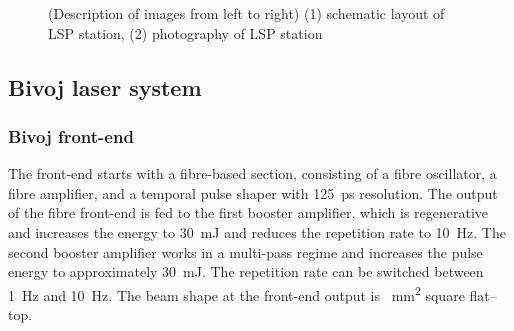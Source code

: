 \begin{figure}[H]
\begin{center}
  \hspace{1cm}
  \caption[(Description of images from left to right) (1) schematic layout of LSP station, (2) photography of LSP station]
    {(Description of images from left to right) (1) schematic layout of LSP station, (2) photography of LSP station \cite{bohm_kaufman_brajer_rostohar_2019}}
  \label{fig:lsplayout}
\end{center}
\end{figure}

\subsection{Bivoj laser system}

\subsubsection*{Bivoj front-end}

The front-end starts with a fibre-based section, consisting
of a fibre oscillator, a fibre amplifier, and a temporal pulse shaper
with \SI{125}{\ps} resolution. The output of the fibre front-end is fed
to the first booster amplifier, which is regenerative and
increases the energy to \SI{30}{\milli\joule} and reduces the repetition rate to \SI{10}{\hertz}. The second booster amplifier works in a multi-pass regime
and increases the pulse energy to approximately \SI{30}{\milli\joule}.
The repetition rate can be switched between \SI{1}{\hertz} and \SI{10}{\hertz}. The 
beam shape at the front-end output is  \SI{}{\mm\squared} square flat--top.

